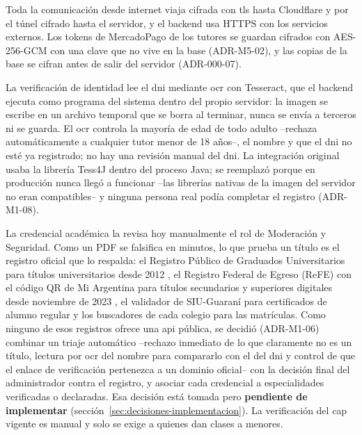Toda la comunicación desde internet viaja cifrada con \gls{tls} hasta Cloudflare
y por el túnel cifrado hasta el servidor, y el backend usa HTTPS con los
servicios externos. Los tokens de MercadoPago de los tutores se guardan
cifrados con AES-256-GCM con una clave que no vive en la base
(ADR-M5-02), y las copias de la base se cifran antes de salir del
servidor (ADR-000-07).

La verificación de identidad lee el \gls{dni} mediante \gls{ocr} con
Tesseract, que el backend ejecuta como programa del sistema dentro del
propio servidor: la imagen se escribe en un archivo temporal que se borra
al terminar, nunca se envía a terceros ni se guarda. El \gls{ocr} controla
la mayoría de edad de todo adulto --rechaza automáticamente a cualquier
tutor menor de 18 años--, el nombre y que el \gls{dni} no esté ya registrado; no
hay una revisión manual del \gls{dni}. La integración original usaba la
librería Tess4J dentro del proceso Java; se reemplazó porque en producción
nunca llegó a funcionar --las librerías nativas de la imagen del
servidor no eran compatibles-- y ninguna persona real podía completar el
registro (ADR-M1-08).

La credencial académica la revisa hoy manualmente el rol de Moderación y
Seguridad. Como un PDF se falsifica en minutos, lo que prueba un título
es el registro oficial que lo respalda: el Registro Público de Graduados
Universitarios para títulos universitarios desde 2012 \citep{rpgu}, el
Registro Federal de Egreso (ReFE) con el código QR de Mi Argentina para
títulos secundarios y superiores digitales desde noviembre de 2023
\citep{refe}, el validador de SIU-Guaraní para certificados de alumno
regular y los buscadores de cada colegio para las matrículas. Como ninguno
de esos registros ofrece una \gls{api} pública, se decidió (ADR-M1-06)
combinar un triaje automático --rechazo inmediato de lo que claramente no
es un título, lectura por \gls{ocr} del nombre para compararlo con el del
\gls{dni} y control de que el enlace de verificación pertenezca a un dominio
oficial-- con la decisión final del administrador contra el registro, y
asociar cada credencial a especialidades verificadas o declaradas. Esa
decisión está tomada pero \textbf{pendiente de implementar}
(sección~\ref{sec:decisiones-implementacion}). La verificación del
\gls{cap} vigente es manual y solo se exige a quienes dan clases a menores.

